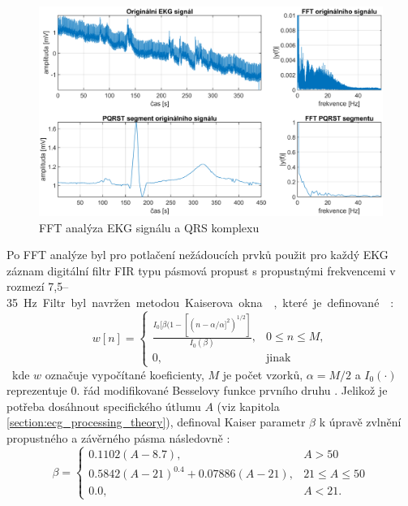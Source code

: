 \begin{figure}[h]
    \begin{center}
        \includegraphics[width=1\textwidth]{../assets/figures/spectral_analysis}
        \caption{FFT analýza EKG signálu a QRS komplexu}
        \label{fig:spectral_analysis}
    \end{center}
\end{figure}

Po FFT analýze byl pro potlačení nežádoucích prvků použit pro každý EKG záznam
digitální filtr FIR typu pásmová propust s propustnými frekvencemi v rozmezí
7,5--35~\si\Hz. Filtr byl navržen metodou Kaiserova okna \cite{Chavan2006},
které je definované \cite{Oppenheim1999}:
\begin{equation}
    \label{eq:kaiser1}
    w[n] =
    \begin{cases}
        \frac{I_0[\beta(1-[(n-\alpha/\alpha]^2)^{1/2}]}{I_0(\beta)}, & 0 \leq n \leq M, \\
        0,                                                           & \text{jinak}
    \end{cases}
\end{equation}
kde $w$ označuje vypočítané koeficienty, $M$ je počet vzorků, $\alpha=M/2$ a
$I_0(\cdot)$ reprezentuje 0. řád modifikované Besselovy funkce prvního druhu
\cite{BesselFcn}. Jelikož je potřeba dosáhnout specifického útlumu $A$ (viz
kapitola \ref{section:ecg_processing_theory}), definoval Kaiser parametr $\beta$
k úpravě zvlnění propustného a závěrného pásma následovně \cite{Oppenheim1999}:
\begin{equation}
    \beta =
    \begin{cases}
        0.1102(A-8.7),                    & A > 50            \\
        0.5842(A-21)^0.4 + 0.07886(A-21), & 21 \leq A \leq 50 \\
        0.0,                              & A < 21.
    \end{cases}
\end{equation}

